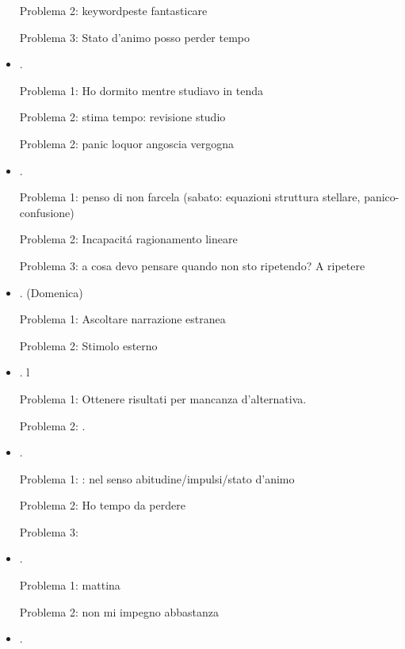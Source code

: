 \begin{itemize}
Problema 2: keyword{peste fantasticare}

Problema 3: Stato d'animo posso perder tempo

\item {}.

Problema 1: Ho dormito mentre studiavo in tenda

Problema 2: stima tempo: revisione studio

Problema 2: panic loquor angoscia vergogna

\item {}.

Problema 1: penso di non farcela (sabato: equazioni struttura stellare, panico-confusione)

Problema 2: Incapacit\'a ragionamento lineare

Problema 3: a cosa devo pensare quando non sto ripetendo? A ripetere

\item {}.
(Domenica)

Problema 1: Ascoltare narrazione estranea

Problema 2: Stimolo esterno

\item {}.
l

Problema 1: Ottenere risultati per mancanza d'alternativa.

Problema 2: .

\item {}.

Problema 1: : nel senso abitudine/impulsi/stato d'animo

Problema 2: Ho tempo da perdere

Problema 3: 

\item {}.

Problema 1: mattina 

Problema 2: non mi impegno abbastanza

\item {}.


\end{itemize}
